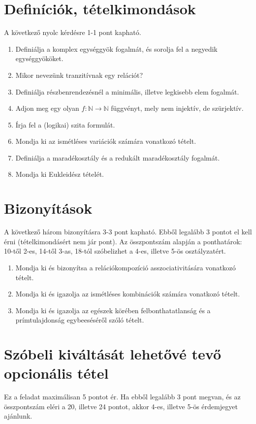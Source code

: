 \documentclass[11pt,a4paper]{article}
\begin{document}
\section{Definíciók, tételkimondások}
A következő nyolc kérdésre 1-1 pont kapható. 
\begin{enumerate}\setlength{\itemsep}{2.2cm}

\item Definiálja a komplex egységgyök fogalmát, és sorolja fel a negyedik egységgyököket.
\item Mikor nevezünk tranzitívnak egy relációt?
\item Definiálja részbenrendezésnél a minimális, illetve legkisebb elem fogalmát.
\item Adjon meg egy olyan $f\colon \mathbb{N}\to\mathbb{N}$ függvényt, mely nem injektív, de szürjektív.
\item Írja fel a (logikai) szita formulát.
\item Mondja ki az ismétléses variációk számára vonatkozó tételt.
\item Definiálja a maradékosztály és a redukált maradékosztály fogalmát.
\item Mondja ki Eukleidész tételét.



\end{enumerate}

\newpage
\section{Bizonyítások}
A következő három bizonyításra 3-3 pont kapható. Ebből legalább 3 pontot el kell érni (tételkimondásért nem jár pont).
Az összpontszám alapján a ponthatárok: 10-től 2-es, 14-től 3-as, 18-tól szóbelizhet a 4-es, illetve 5-ös osztályzatért.
\begin{enumerate}

\item Mondja ki és bizonyítsa a relációkompozíció asszociativitására vonatkozó tételt.
\item Mondja ki és igazolja az ismétléses kombinációk számára vonatkozó tételt.
\item Mondja ki és igazolja az egészek körében felbonthatatlanság és a prímtulajdonság egybeeséséről szóló tételt.

\end{enumerate}


\section{Szóbeli kiváltását lehetővé tevő opcionális tétel}
Ez a feladat maximálisan 5 pontot ér. Ha ebből legalább 3 pont megvan, és az összpontszám eléri a 20, illetve 24 pontot, akkor 4-es, illetve 5-ös érdemjegyet ajánlunk.
\end{document}
